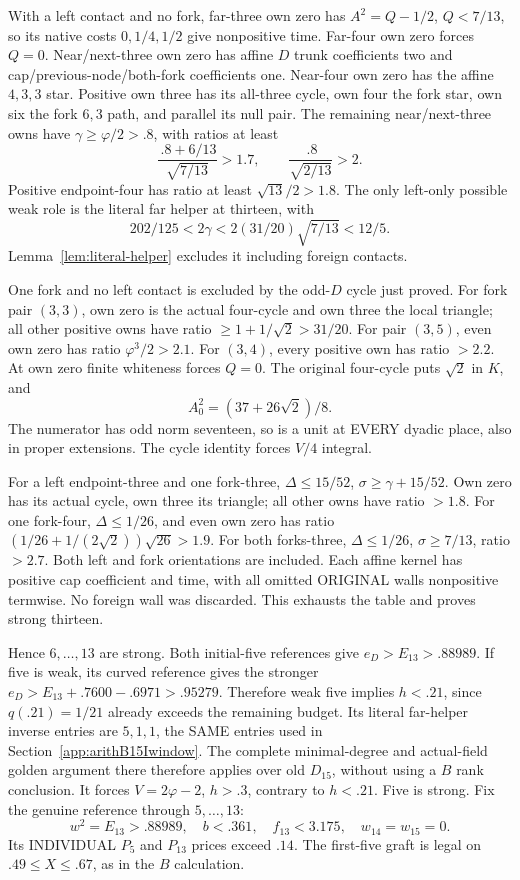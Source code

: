 \documentclass[11pt]{article}
\begin{document}
With a left contact and no fork, far-three own zero
has \(A^2=Q-1/2\), \(Q<7/13\), so its native
costs \(0,1/4,1/2\) give nonpositive time.
Far-four own zero forces \(Q=0\).
Near/next-three own zero has affine \(D\) trunk
coefficients two and cap/previous-node/both-fork
coefficients one.
Near-four own zero has the affine \(4,3,3\) star.
Positive own three has its all-three cycle,
own four the fork star, own six the fork \(6,3\)
path, and parallel its null pair.
The remaining near/next-three owns have
\(\gamma\ge\varphi/2>.8\), with ratios at least
\[
 {\frac{\, .8+6/13}{\sqrt{7/13}}}>1.7,\qquad
 {\frac{\, .8}{\sqrt{2/13}}}>2.
\]
Positive endpoint-four has ratio at least
\(\sqrt{13}/2>1.8\).
The only left-only possible weak role is the literal
far helper at thirteen, with
\[
       202/125<2\gamma<2(31/20)\sqrt{7/13}<12/5.
\]
Lemma~\ref{lem:literal-helper} excludes it including
foreign contacts.

One fork and no left contact is excluded by the
odd-\(D\) cycle just proved.
For fork pair \((3,3)\), own zero is the actual
four-cycle and own three the local triangle;
all other positive owns have ratio
\(\ge1+1/\sqrt2>31/20\).
For pair \((3,5)\), even own zero has ratio
\(\varphi^3/2>2.1\).
For \((3,4)\), every positive own has ratio \(>2.2\).
At own zero finite whiteness forces \(Q=0\).
The original four-cycle puts \(\sqrt2\) in \(K\),
and
\[
                      A_0^2=(37+26\sqrt2)/8 .
\]
The numerator has odd norm seventeen, so is a unit
at EVERY dyadic place, also in proper extensions.
The cycle identity forces \(V/4\) integral.

For a left endpoint-three and one fork-three,
\(\Delta\le15/52\), \(\sigma\ge\gamma+15/52\).
Own zero has its actual cycle, own three its triangle;
all other owns have ratio \(>1.8\).
For one fork-four,
\(\Delta\le1/26\), and even own zero has ratio
\((1/26+1/(2\sqrt2))\sqrt{26}>1.9\).
For both forks-three,
\(\Delta\le1/26\), \(\sigma\ge7/13\), ratio \(>2.7\).
Both left and fork orientations are included.
Each affine kernel has positive cap coefficient and
time, with all omitted ORIGINAL walls nonpositive
termwise.  No foreign wall was discarded.
This exhausts the table and proves strong thirteen.

Hence \(6,\ldots,13\) are strong.
Both initial-five references give \(e_D>E_{13}>.88989\).
If five is weak, its curved reference gives the stronger
\(e_D>E_{13}+.7600-.6971>.95279\).
Therefore weak five implies \(h<.21\), since
\(q(.21)=1/21\) already exceeds the remaining budget.
Its literal far-helper inverse entries are \(5,1,1\),
the SAME entries used in Section~\ref{app:arithB15Iwindow}.
The complete minimal-degree and actual-field golden
argument there therefore applies over old \(D_{15}\),
without using a \(B\) rank conclusion.
It forces \(V=2\varphi-2\), \(h>.3\), contrary to
\(h<.21\).
Five is strong.
Fix the genuine reference through \(5,\ldots,13\):
\[
 w^2=E_{13}>.88989,\quad
 b<.361,\quad f_{13}<3.175,\quad
 w_{14}=w_{15}=0.
\]
Its INDIVIDUAL \(P_5\) and \(P_{13}\) prices exceed
\(.14\).  The first-five graft is legal on
\(.49\le X\le.67\), as in the \(B\) calculation.
\end{document}
